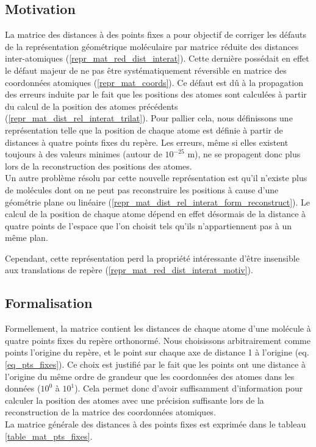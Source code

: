 \label{repr_mat_pts_fixes}

\subsection{Motivation}
\par La matrice des distances à des points fixes a pour objectif de corriger les défauts de la représentation géométrique moléculaire par matrice réduite des distances inter-atomiques (\ref{repr_mat_red_dist_interat}). Cette dernière possédait en effet le défaut majeur de ne pas être systématiquement réversible en matrice des coordonnées atomiques (\ref{repr_mat_coords}). Ce défaut est dû à la propagation des erreurs induite par le fait que les positions des atomes sont calculées à partir du calcul de la position des atomes précédents (\ref{repr_mat_dist_rel_interat_trilat}). Pour pallier cela, nous définissons une représentation telle que la position de chaque atome est définie à partir de distances à quatre points fixes du repère. Les erreurs, même si elles existent toujours à des valeurs minimes (autour de $10^{-25}$ m), ne se propagent donc plus lors de la reconstruction des positions des atomes.\\
Un autre problème résolu par cette nouvelle représentation est qu'il n'existe plus de molécules dont on ne peut pas reconstruire les positions à cause d'une géométrie plane ou linéaire (\ref{repr_mat_dist_rel_interat_form_reconstruct}). Le calcul de la position de chaque atome dépend en effet désormais de la distance à quatre points de l'espace que l'on choisit tels qu'ils n'appartiennent pas à un même plan.\\
\par Cependant, cette représentation perd la propriété intéressante d'être insensible aux translations de repère (\ref{repr_mat_red_dist_interat_motiv}).
\subsection{Formalisation}
\par Formellement, la matrice contient les distances de chaque atome d'une molécule à quatre points fixes du repère orthonormé. Nous choisissons arbitrairement comme points l'origine du repère, et le point sur chaque axe de distance 1 à l'origine (eq. \ref{eq_pts_fixes}). Ce choix est justifié par le fait que les points ont une distance à l'origine du même ordre de grandeur que les coordonnées des atomes dans les données ($10^0$ à $10^1$). Cela permet donc d'avoir suffisamment d'information pour calculer la position des atomes avec une précision suffisante lors de la reconstruction de la matrice des coordonnées atomiques.\\
La matrice générale des distances à des points fixes est exprimée dans le tableau \ref{table_mat_pts_fixes}.

